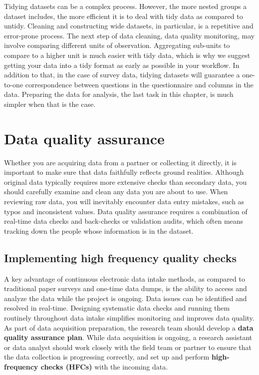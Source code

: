 Tidying datasets can be a complex process.
However, the more nested groups a dataset includes,
the more efficient it is to deal with tidy data as compared to untidy.
Cleaning and constructing wide datasets, in particular,
is a repetitive and error-prone process.
The next step of data cleaning, data quality monitoring,
may involve comparing different units of observation.
Aggregating sub-units to compare to a higher unit is much easier with tidy data,
which is why we suggest getting your data into a tidy format as early as possible in your workflow. 
In addition to that, in the case of survey data,
tidying datasets will guarantee a one-to-one correspondence
between questions in the questionnaire and columns in the data.
Preparing the data for analysis, the last task in this chapter, 
is much simpler when that is the case. 
 
\section{Data quality assurance}

Whether you are acquiring data from a partner or collecting it directly,
it is important to make sure that data faithfully reflects ground realities.
Although original data typically requires more extensive checks than secondary data,
you should carefully examine and clean any data you are about to use.
When reviewing raw data, you will inevitably encounter data entry mistakes,
such as typos and inconsistent values.
Data quality assurance requires a combination of real-time data checks
and back-checks or validation audits, which often means tracking down
the people whose information is in the dataset.

\subsection{Implementing high frequency quality checks}

A key advantage of continuous electronic data intake methods,
as compared to traditional paper surveys and one-time data dumps,
is the ability to access and analyze the data while the project is ongoing.
Data issues can be identified and resolved in real-time.
Designing systematic data checks and running them routinely throughout data intake
simplifies monitoring and improves data quality.
As part of data acquisition preparation,
the research team should develop a \textbf{data quality assurance plan}.
While data acquisition is ongoing,
a research assistant or data analyst should work closely with the field team or partner
to ensure that the data collection is progressing correctly,
and set up and perform \textbf{high-frequency checks (HFCs)} with the incoming data.

